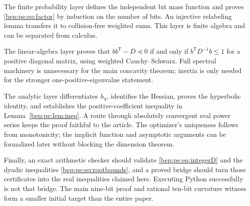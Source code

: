 \documentclass[11pt]{article}
\numberwithin{equation}{section}
\theoremstyle{definition}
\theoremstyle{remark}
\begin{document}
The finite probability layer defines the independent bit mass function
and proves \eqref{bep:pe:eq:factor} by induction on the number of bits. An
injective relabeling lemma transfers it to collision-free weighted sums.
This layer is finite algebra and can be separated from calculus.

The linear-algebra layer proves that $bb^{\mathsf T}-D\preceq0$ if and
only if $b^{\mathsf T}D^{-1}b\leq1$ for a positive diagonal matrix,
using weighted Cauchy--Schwarz. Full spectral machinery is unnecessary
for the main concavity theorem; inertia is only needed for the stronger
one-positive-eigenvalue statement.

The analytic layer differentiates $h_q$, identifies the Hessian, proves
the hyperbolic identity, and establishes the positive-coefficient
inequality in Lemma~\ref{bep:pe:lem:ineq}. A route through absolutely
convergent real power series keeps the proof faithful to the article.
The optimizer's uniqueness follows from monotonicity; the implicit
function and asymptotic arguments can be formalized later without
blocking the dimension theorem.

Finally, an exact arithmetic checker should validate
\eqref{bep:pe:eq:integerD} and the dyadic inequalities
\eqref{bep:pe:eq:rootbounds}, and a proved bridge should turn those certificates
into the real inequalities claimed here. Executing Python successfully
is not that bridge. The main nine-bit proof and rational ten-bit
curvature witness form a smaller initial target than the entire paper.
\end{document}
